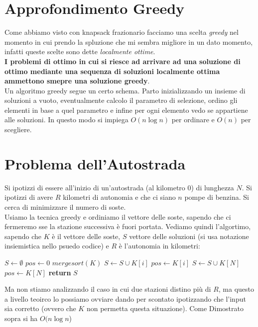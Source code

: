 \documentclass[a4paper,12pt, oneside]{book}
\begin{document}
\section{Approfondimento Greedy}
Come abbiamo visto con knapsack frazionario facciamo una scelta
\textit{greedy} nel momento in cui prendo la spluzione che mi sembra
migliore in un dato momento, infatti queste scelte sono dette
\textit{localmente ottime}.\\
\textbf{I problemi di ottimo in cui si riesce ad arrivare ad una soluzione di
  ottimo mediante una sequenza di soluzioni localmente ottima
  ammettono smepre una soluzione greedy}.\\
Un algoritmo greedy segue un certo schema. Parto inizializzando un insieme
di soluzioni a vuoto, eventualmente calcolo il parametro di selezione,
ordino gli elementi in base a quel parametro e infine per ogni
elemento vedo se appartiene alle soluzioni. In questo modo si impiega
$O(n\log n)$ per ordinare e $O(n)$ per scegliere.\\
\section{Problema dell'Autostrada}
Si ipotizzi di essere all'inizio di un'autostrada (al kilometro 0) di
lunghezza $N$. Si ipotizzi di avere $R$ kilometri di autonomia e che
ci siano $n$ pompe di benzina. Si cerca di minimizzare il numero di
soste.\\
Usiamo la tecnica greedy e ordiniamo il vettore delle soste, sapendo
che ci fermeremo sse la stazione successiva è fuori portata. Vediamo
quindi l'algortimo, sapendo che $K$ è il vettore delle soste, $S$
vettore delle soluzioni (si usa notazione insiemistica nello psuedo
codice) e $R$ è l'autonomia in kilometri:
\begin{algorithm}[H]
  \begin{algorithmic}
    \State $S\gets \emptyset$
    \State $pos\gets 0$
    \State $mergesort(K)$
    \State $S\gets S\cup K[i]$
    \State $pos \gets K[i]$
    \EndIf
    \EndFor
    \State $S\gets S\cup K[N]$
    \State $pos \gets K[N]$
    \EndIf
    \State \textbf{return }$S$
    \EndFunction
  \end{algorithmic}
\end{algorithm}
Ma non stiamo analizzando il caso in cui due stazioni distino più di
$R$, ma questo a livello teoirco lo possiamo ovviare dando per
scontato ipotizzando che l'input sia corretto (ovvero che $K$ non
permetta questa situazione). Come Dimostrato sopra si ha $O(n\log n$)
\end{document}
